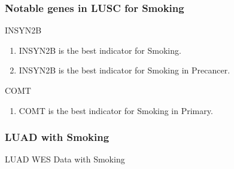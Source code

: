 \documentclass{beamer}
\begin{document}
    \begin{frame}[allowframebreaks]
        \frametitle{Notable genes in LUSC for Smoking}

        \begin{block}{INSYN2B}
            \begin{enumerate}
                \item INSYN2B is the best indicator for Smoking.
                \item INSYN2B is the best indicator for Smoking in Precancer.
            \end{enumerate}
        \end{block}

        \begin{block}{COMT}
            \begin{enumerate}
                \item COMT is the best indicator for Smoking in Primary.
            \end{enumerate}
        \end{block}
    \end{frame}

    \begin{frame}
        \frametitle{LUAD with Smoking}

        \begin{table}
            \caption{LUAD WES Data with Smoking}
            \resizebox{!}{0.3 \textheight}
            {}
        \end{table}
    \end{frame}
\end{document}

